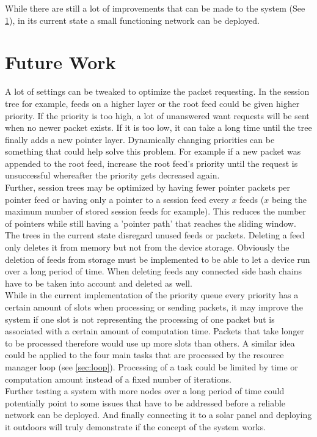 While there are still a lot of improvements that can be made to the system (See \cref{sec:futurework}), in its current state a small functioning network can be deployed.

\section{Future Work}
\label{sec:futurework}
A lot of settings can be tweaked to optimize the packet requesting. In the session tree for example, feeds on a higher layer or the root feed could be given higher priority. If the priority is too high, a lot of unanswered want requests will be sent when no newer packet exists. If it is too low, it can take a long time until the tree finally adds a new pointer layer. Dynamically changing priorities can be something that could help solve this problem. For example if a new packet was appended to the root feed, increase the root feed's priority until the request is unsuccessful whereafter the priority gets decreased again. \\
Further, session trees may be optimized by having fewer pointer packets per pointer feed or having only a pointer to a session feed every $x$ feeds ($x$ being the maximum number of stored session feeds for example). This reduces the number of pointers while still having a 'pointer path' that reaches the sliding window. \\
The trees in the current state disregard unused feeds or packets. Deleting a feed only deletes it from memory but not from the device storage. Obviously the deletion of feeds from storage must be implemented to be able to let a device run over a long period of time. When deleting feeds any connected side hash chains have to be taken into account and deleted as well.\\
While in the current implementation of the priority queue every priority has a certain amount of slots when processing or sending packets, it may improve the system if one slot is not representing the processing of one packet but is associated with a certain amount of computation time. Packets that take longer to be processed therefore would use up more slots than others. A similar idea could be applied to the four main tasks that are processed by the resource manager loop (see \cref{sec:loop}). Processing of a task could be limited by time or computation amount instead of a fixed number of iterations. \\
Further testing a system with more nodes over a long period of time could potentially point to some issues that have to be addressed before a reliable network can be deployed. And finally connecting it to a solar panel and deploying it outdoors will truly demonstrate if the concept of the system works. \\